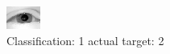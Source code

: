 \begin{figure}[h!]
\begin{center}
\includegraphics[width=0.60\columnwidth]{figures/ID2370_class_1_target_2.png}
\end{center}
\caption{ Classification: 1 actual target: 2}
\label{fig:ID2370_class_1_target_2}
\end{figure}
